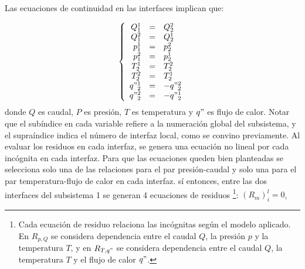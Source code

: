 Las ecuaciones de continuidad en las interfaces implican que:

\begin{equation}
\left\{ \begin{array}{rcl}
Q_1^1&=& Q_2^2 \\
Q_1^2&=& Q_2^1 \\
p_1^1&=& p_2^2 \\
p_1^2&=& p_2^1 \\
T_2^1&=& T_2^2 \\
T_2^2&=& T_2^1 \\
q"_2^1&=& - q"_2^2 \\
q"_2^2&=& - q"_2^1
\end{array}
\right.
\end{equation}
donde $Q$ es caudal, $P$ es presión, $T$ es temperatura y $q"$ es flujo de calor. 
Notar que el subíndice en cada variable refiere a la numeración global del subsistema, y el supraíndice indica el número de interfaz local,
como se convino previamente.
Al evaluar los residuos en cada interfaz, se genera una ecuación no lineal por cada incógnita en cada interfaz.
Para que las ecuaciones queden bien planteadas se selecciona solo una de las relaciones para el par presión-caudal
y solo una para el par temperatura-flujo de calor en cada interfaz.
sí entonces, entre las dos interfaces del subsistema 1 se generan 4 ecuaciones de residuos
\footnote{
Cada ecuación de residuo relaciona las incógnitas según el modelo aplicado.
En $R_{p,Q}$ se considera dependencia entre el caudal $Q$, la presión $p$ y la temperatura $T$, y en 
$R_{T,q"}$ se considera dependencia entre el caudal $Q$, la temperatura $T$ y el flujo de calor $q"$.
}:
$(R_m)_{i}^{l}=0$,

